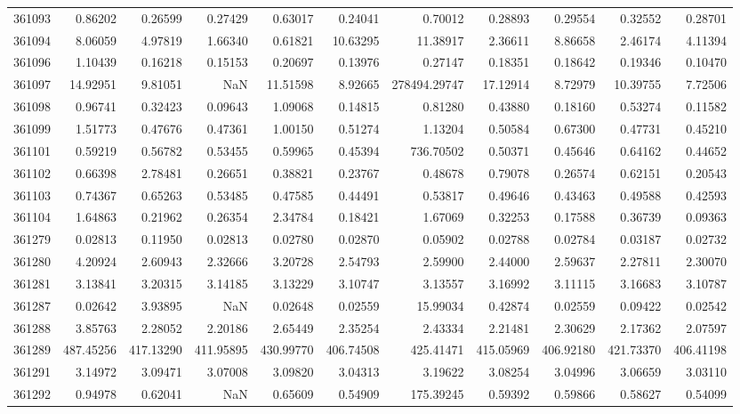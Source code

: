 \begin{tabular}{lrrrrrrrrrr}
361093 & 0.86202 & 0.26599 & 0.27429 & 0.63017 & 0.24041 & 0.70012 & 0.28893 & 0.29554 & 0.32552 & 0.28701 \\
361094 & 8.06059 & 4.97819 & 1.66340 & 0.61821 & 10.63295 & 11.38917 & 2.36611 & 8.86658 & 2.46174 & 4.11394 \\
361096 & 1.10439 & 0.16218 & 0.15153 & 0.20697 & 0.13976 & 0.27147 & 0.18351 & 0.18642 & 0.19346 & 0.10470 \\
361097 & 14.92951 & 9.81051 & NaN & 11.51598 & 8.92665 & 278494.29747 & 17.12914 & 8.72979 & 10.39755 & 7.72506 \\
361098 & 0.96741 & 0.32423 & 0.09643 & 1.09068 & 0.14815 & 0.81280 & 0.43880 & 0.18160 & 0.53274 & 0.11582 \\
361099 & 1.51773 & 0.47676 & 0.47361 & 1.00150 & 0.51274 & 1.13204 & 0.50584 & 0.67300 & 0.47731 & 0.45210 \\
361101 & 0.59219 & 0.56782 & 0.53455 & 0.59965 & 0.45394 & 736.70502 & 0.50371 & 0.45646 & 0.64162 & 0.44652 \\
361102 & 0.66398 & 2.78481 & 0.26651 & 0.38821 & 0.23767 & 0.48678 & 0.79078 & 0.26574 & 0.62151 & 0.20543 \\
361103 & 0.74367 & 0.65263 & 0.53485 & 0.47585 & 0.44491 & 0.53817 & 0.49646 & 0.43463 & 0.49588 & 0.42593 \\
361104 & 1.64863 & 0.21962 & 0.26354 & 2.34784 & 0.18421 & 1.67069 & 0.32253 & 0.17588 & 0.36739 & 0.09363 \\
361279 & 0.02813 & 0.11950 & 0.02813 & 0.02780 & 0.02870 & 0.05902 & 0.02788 & 0.02784 & 0.03187 & 0.02732 \\
361280 & 4.20924 & 2.60943 & 2.32666 & 3.20728 & 2.54793 & 2.59900 & 2.44000 & 2.59637 & 2.27811 & 2.30070 \\
361281 & 3.13841 & 3.20315 & 3.14185 & 3.13229 & 3.10747 & 3.13557 & 3.16992 & 3.11115 & 3.16683 & 3.10787 \\
361287 & 0.02642 & 3.93895 & NaN & 0.02648 & 0.02559 & 15.99034 & 0.42874 & 0.02559 & 0.09422 & 0.02542 \\
361288 & 3.85763 & 2.28052 & 2.20186 & 2.65449 & 2.35254 & 2.43334 & 2.21481 & 2.30629 & 2.17362 & 2.07597 \\
361289 & 487.45256 & 417.13290 & 411.95895 & 430.99770 & 406.74508 & 425.41471 & 415.05969 & 406.92180 & 421.73370 & 406.41198 \\
361291 & 3.14972 & 3.09471 & 3.07008 & 3.09820 & 3.04313 & 3.19622 & 3.08254 & 3.04996 & 3.06659 & 3.03110 \\
361292 & 0.94978 & 0.62041 & NaN & 0.65609 & 0.54909 & 175.39245 & 0.59392 & 0.59866 & 0.58627 & 0.54099 \\

\end{tabular}
